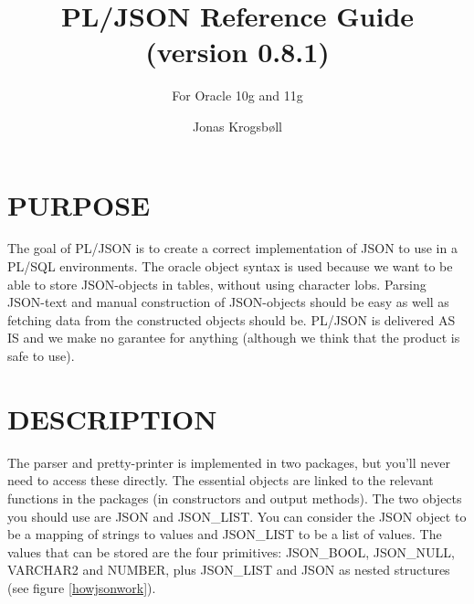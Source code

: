 \documentclass[11pt,twocolumn, a4paper]{article}
\title{PL/JSON Reference Guide (version 0.8.1)}
\subtitle{For Oracle 10g and 11g}
\author{Jonas Krogsbøll}
\date{}
\begin{document}
\maketitle

\section*{PURPOSE}
The goal of PL/JSON is to create a correct implementation of JSON to use in a PL/SQL environments. The oracle object syntax is used because we want to be able to store JSON-objects in tables, without using character lobs. Parsing JSON-text and manual construction of JSON-objects should be easy as well as fetching data from the constructed objects should be. PL/JSON is delivered AS IS and we make no garantee for anything (although we think that the product is safe to use).

\section*{DESCRIPTION}
The parser and pretty-printer is implemented in two packages, but you'll never need to access these directly. The essential objects are linked to the relevant functions in the packages (in constructors and output methods). The two objects you should use are JSON and JSON\_LIST. You can consider the JSON object to be a mapping of strings to values and JSON\_LIST to be a list of values. The values that can be stored are the four primitives: JSON\_BOOL, JSON\_NULL, VARCHAR2 and NUMBER, plus JSON\_LIST and JSON as nested structures (see figure \ref{howjsonwork}).
\end{document}
